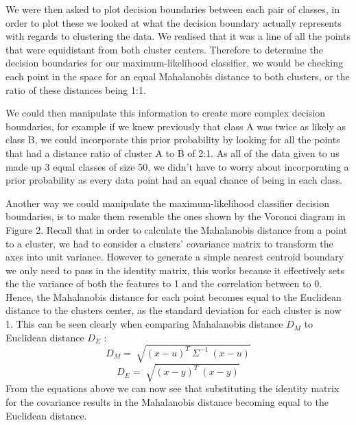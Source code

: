 \documentclass[a4paper]{article}
\begin{document}
We were then asked to plot decision boundaries between each pair of classes, in order to plot these we looked at what the decision boundary actually represents with regards to clustering the data. We realised that it was a line of all the points that were equidistant from both cluster centers. Therefore to determine the decision boundaries for our maximum-likelihood classifier, we would be checking each point in the space for an equal Mahalanobis distance to both clusters, or the ratio of these distances being 1:1. 

We could then manipulate this information to create more complex decision boundaries, for example if we knew previously that class A was twice as likely as class B, we could incorporate this prior probability by looking for all the points that had a distance ratio of cluster A to B of 2:1. As all of the data given to us made up 3 equal classes of size 50, we didn't have to worry about incorporating a prior probability as every data point had an equal chance of being in each class.

Another way we could manipulate the maximum-likelihood classifier decision boundaries, is to make them resemble the ones shown by the Voronoi diagram in Figure 2. Recall that in order to calculate the Mahalanobis distance from a point to a cluster, we had to consider a clusters' covariance matrix to transform the axes into unit variance. However to generate a simple nearest centroid boundary we only need to pass in the identity matrix, this works because it effectively sets the the variance of both the features to 1 and the correlation between to 0. Hence, the Mahalanobis distance for each point becomes equal to the Euclidean distance to the clusters center, as the standard deviation for each cluster is now 1. This can be seen clearly when comparing Mahalanobis distance $D_M$ to Euclidean distance $D_E$ \cite{mahal}:
\begin{equation}
D_M = \sqrt[]{(x - u)^T \ \Sigma ^ {-1} \ (x - u)}
\end{equation}
\begin{equation}
D_E = \sqrt[]{(x - y)^T  \ (x - y)} 
\end{equation}
From the equations above we can now see that substituting the identity matrix for the covariance results in the Mahalanobis distance becoming equal to the Euclidean distance. 
\end{document}
